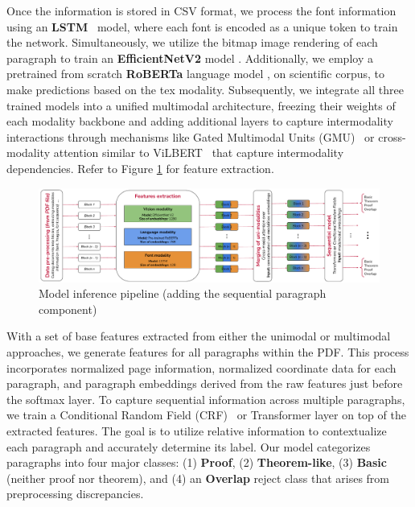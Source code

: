 \documentclass[runningheads]{llncs}
\begin{document}
Once the information is stored in CSV format, we process the font information using an \textbf{LSTM}~\cite{hochreiter1997long} model, where 
each font is encoded as a unique token to train the network. Simultaneously, we utilize the bitmap image 
rendering of each paragraph to train an \textbf{EfficientNetV2} model \cite{efficientnet}. Additionally, we employ a pretrained from scratch \textbf{RoBERTa} language model \cite{mishra:tel-04665528}, 
on scientific corpus, to make predictions based on the tex modality. Subsequently, we 
integrate all three trained models into a unified multimodal architecture, freezing their weights of each modality backbone and adding 
additional layers to capture intermodality interactions through mechanisms like Gated Multimodal Units 
(GMU)~\cite{arevalo2020gated} or cross-modality attention similar to ViLBERT~\cite{DBLP:conf/nips/LuBPL19} that capture intermodality dependencies. Refer to Figure \ref{fig:generalpipeline} for feature extraction.


\begin{figure}[h]
    \centering
    \includegraphics[width=\textwidth]{images/general_pipeline.pdf}
    \caption{Model inference pipeline (adding the sequential paragraph component)}
    \label{fig:generalpipeline}
\end{figure}


With a set of base features extracted from either the unimodal or multimodal approaches, we generate 
features for all paragraphs within the PDF. This process incorporates normalized page information, 
normalized coordinate data for each paragraph, and paragraph embeddings derived from the raw features 
just before the softmax layer. To capture sequential information across multiple paragraphs, we train a 
Conditional Random Field (CRF)~\cite{crf} or Transformer layer on top of the extracted features. The goal is to utilize 
relative information to contextualize each paragraph and accurately determine its label. Our model 
categorizes paragraphs into four major classes: (1) \textbf{Proof}, (2) \textbf{Theorem-like}, (3) \textbf{Basic} (neither 
proof nor theorem), and (4) an \textbf{Overlap} reject class that arises from preprocessing discrepancies.
\end{document}
